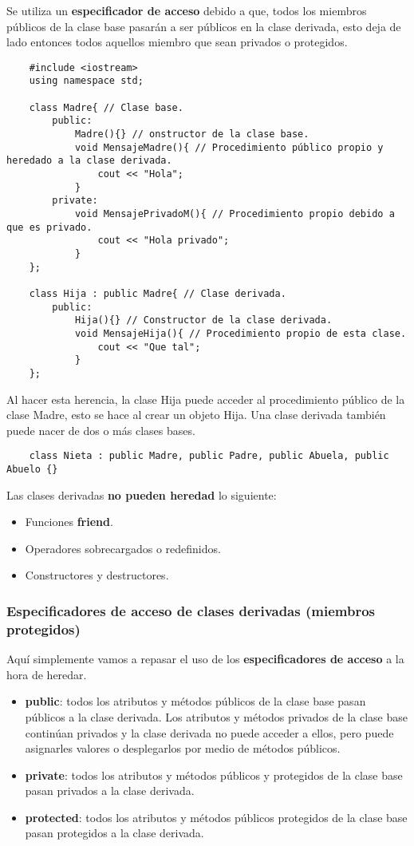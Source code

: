 Se utiliza un \textbf{especificador de acceso} debido a que, todos los miembros públicos de la clase base pasarán a ser públicos en la clase derivada, esto deja de lado entonces todos aquellos miembro que sean privados o protegidos.
\begin{lstlisting}
    #include <iostream>
    using namespace std;
    
    class Madre{ // Clase base.
        public:
            Madre(){} // onstructor de la clase base.
            void MensajeMadre(){ // Procedimiento público propio y heredado a la clase derivada.
                cout << "Hola";
            }
        private:
            void MensajePrivadoM(){ // Procedimiento propio debido a que es privado.
                cout << "Hola privado";
            }
    };
    
    class Hija : public Madre{ // Clase derivada.
        public:
            Hija(){} // Constructor de la clase derivada.
            void MensajeHija(){ // Procedimiento propio de esta clase.
                cout << "Que tal";
            }
    };
\end{lstlisting}

Al hacer esta herencia, la clase Hija puede acceder al procedimiento público de la clase Madre, esto se hace al crear un objeto Hija. Una clase derivada también puede nacer de dos o más clases bases.
\begin{lstlisting}
    class Nieta : public Madre, public Padre, public Abuela, public Abuelo {}
\end{lstlisting}

Las clases derivadas \textbf{no pueden heredad} lo siguiente:
\begin{itemize}
    \item Funciones \textbf{friend}.
    \item Operadores sobrecargados o redefinidos.
    \item Constructores y destructores.
\end{itemize}


\subsubsection{Especificadores de acceso de clases derivadas (miembros protegidos)}

Aquí simplemente vamos a repasar el uso de los \textbf{especificadores de acceso} a la hora de heredar.
\begin{itemize}
    \item \textbf{public}: todos los atributos y métodos públicos de la clase base pasan públicos a la clase derivada. Los atributos y métodos privados de la clase base continúan privados y la clase derivada no puede acceder a ellos, pero puede asignarles valores o desplegarlos por medio de métodos públicos.
    \item \textbf{private}: todos los atributos y métodos públicos y protegidos de la clase base pasan privados a la clase derivada.
    \item \textbf{protected}: todos los atributos y métodos públicos protegidos de la clase base pasan protegidos a la clase derivada.
\end{itemize}

